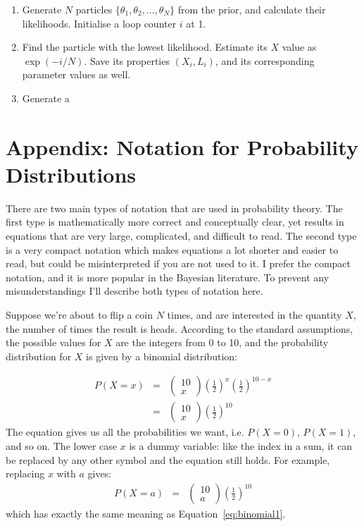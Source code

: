 \begin{enumerate}
\item Generate $N$ particles $\{\theta_1, \theta_2, ..., \theta_N\}$ from
the prior, and calculate their likelihoods. Initialise a loop counter $i$ at
1.
\item Find the particle with the lowest likelihood. Estimate its $X$ value as
$\exp(-i/N)$. Save its properties $(X_i, L_i)$, and its corresponding
parameter values as well.
\item Generate a 
\end{enumerate}

\section{Appendix: Notation for Probability Distributions}
There are two main types of notation that are used in probability theory. The
first type is mathematically more correct and conceptually
clear, yet results in equations that are very large, complicated,
and difficult to read.
The second type is a very compact notation which makes equations a lot
shorter and easier to read, but could be misinterpreted if you are not used to
it. I prefer the compact notation, and it is more popular in the Bayesian
literature. To prevent any misunderstandings I'll describe both types of
notation here.

Suppose we're about to flip a coin $N$ times, and are interested in the
quantity $X$, the number of times the result is heads. According
to the standard assumptions, the possible values for $X$ are the integers from 0
to 10, and the probability distribution for $X$ is given by
a binomial distribution:

\begin{eqnarray}
P(X = x) &=& \left(\begin{array}{cc}10\\ x\end{array}\right)
\left(\frac{1}{2}\right)^x\left(\frac{1}{2}\right)^{10 - x}\nonumber\\
&=& \left(\begin{array}{cc}10\\ x\end{array}\right)
\left(\frac{1}{2}\right)^{10}\label{eq:binomial1}
\end{eqnarray}
The equation gives us all the probabilities we want, i.e. $P(X=0)$, $P(X=1)$,
and so on. The lower case $x$ is a dummy variable: like the index in a sum, it
can be replaced by any other symbol and the equation still holds. For example,
replacing $x$ with $a$ gives:
\begin{eqnarray}
P(X = a) &=& \left(\begin{array}{cc}10\\ a\end{array}\right)
\left(\frac{1}{2}\right)^{10}\label{eq:binomial2}
\end{eqnarray}
which has exactly the same meaning as Equation~\ref{eq:binomial1}.

